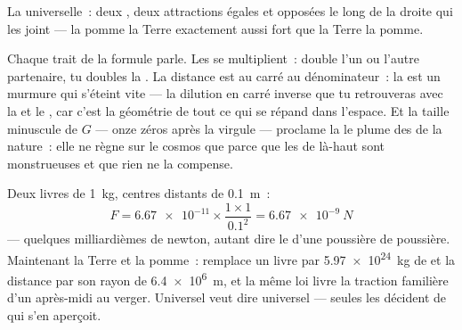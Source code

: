\begin{omfigure}

{\small La  universelle~: deux , deux attractions
égales et opposées le long de la droite qui les joint --- la pomme
 la Terre exactement aussi fort que la Terre  la pomme.}
\end{omfigure}

\begin{example}\label{ex:g9:gravitation:reading}
Chaque trait de la formule parle. Les  se multiplient~: double
l'un ou l'autre partenaire, tu doubles la . La distance est au
carré au dénominateur~: la  est un murmure qui s'éteint
vite --- la dilution en carré inverse que tu retrouveras avec la
 et le , car c'est la géométrie de tout ce qui se répand
dans l'espace. Et la taille minuscule de $G$ --- onze zéros après la
virgule --- proclame la  le  plume des  de la
nature~: elle ne règne sur le cosmos que parce que les  de
là-haut sont monstrueuses et que rien ne la compense.
\end{example}

\begin{example}\label{ex:g9:gravitation:books}
Deux livres de \qty{1}{kg}, centres distants de \qty{0.1}{m}~:
\[
F = \num{6.67e-11} \times \frac{1 \times 1}{0.1^2}
= \qty{6.67e-9}{N}
\]
--- quelques milliardièmes de newton, autant dire le  d'une
poussière de poussière. Maintenant la Terre et la pomme~: remplace
un livre par \qty{5.97e24}{kg} de  et la distance par son
rayon de \qty{6.4e6}{m}, et la même loi livre la traction familière
d'un après-midi au verger. Universel veut dire universel --- seules
les  décident de qui s'en aperçoit.
\end{example}

